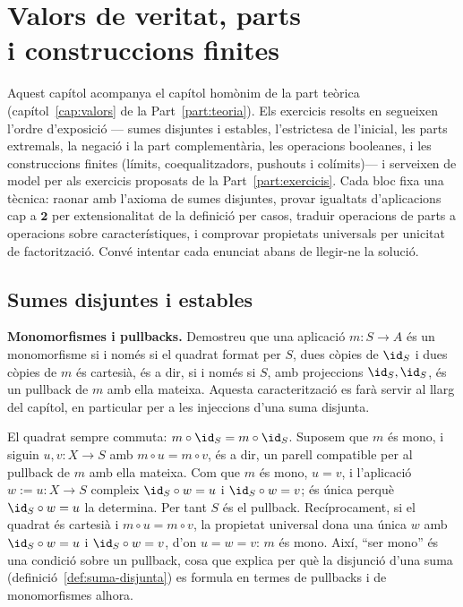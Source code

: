 \chapter[Valors de veritat i construccions finites]{Valors de veritat, parts\texorpdfstring{\\}{ }i construccions finites}\label{cap:practica-valors}

Aquest capítol acompanya el capítol homònim de la part teòrica (capítol~\ref{cap:valors} de la Part~\ref{part:teoria}). Els exercicis resolts en segueixen l'ordre d'exposició --- sumes disjuntes i estables, l'estrictesa de l'inicial, les parts extremals, la negació i la part complementària, les operacions booleanes, i les construccions finites (límits, coequalitzadors, pushouts i colímits)--- i serveixen de model per als exercicis proposats de la Part~\ref{part:exercicis}. Cada bloc fixa una tècnica: raonar amb l'axioma de sumes disjuntes, provar igualtats d'aplicacions cap a \(\mathbf2\) per extensionalitat de la definició per casos, traduir operacions de parts a operacions sobre característiques, i comprovar propietats universals per unicitat de factorització. Convé intentar cada enunciat abans de llegir-ne la solució.

\section{Sumes disjuntes i estables}\label{prac:sumes-disjuntes}

\begin{exercici}
\textbf{Monomorfismes i pullbacks.} Demostreu que una aplicació \(m:S\to A\) és un monomorfisme si i només si el quadrat format per \(S\), dues còpies de \(\id_S\) i dues còpies de \(m\) és cartesià, és a dir, si i només si \(S\), amb projeccions \(\id_S,\id_S\), és un pullback de \(m\) amb ella mateixa. Aquesta caracterització es farà servir al llarg del capítol, en particular per a les injeccions d'una suma disjunta.
\end{exercici}
\begin{solucio}
El quadrat sempre commuta: \(m\circ\id_S=m\circ\id_S\). Suposem que \(m\) és mono, i siguin \(u,v:X\to S\) amb \(m\circ u=m\circ v\), és a dir, un parell compatible per al pullback de \(m\) amb ella mateixa. Com que \(m\) és mono, \(u=v\), i l'aplicació \(w:=u:X\to S\) compleix \(\id_S\circ w=u\) i \(\id_S\circ w=v\); és única perquè \(\id_S\circ w=u\) la determina. Per tant \(S\) és el pullback. Recíprocament, si el quadrat és cartesià i \(m\circ u=m\circ v\), la propietat universal dona una única \(w\) amb \(\id_S\circ w=u\) i \(\id_S\circ w=v\), d'on \(u=w=v\): \(m\) és mono. Així, \enquote{ser mono} és una condició sobre un pullback, cosa que explica per què la disjunció d'una suma (definició~\ref{def:suma-disjunta}) es formula en termes de pullbacks i de monomorfismes alhora.
\end{solucio}


